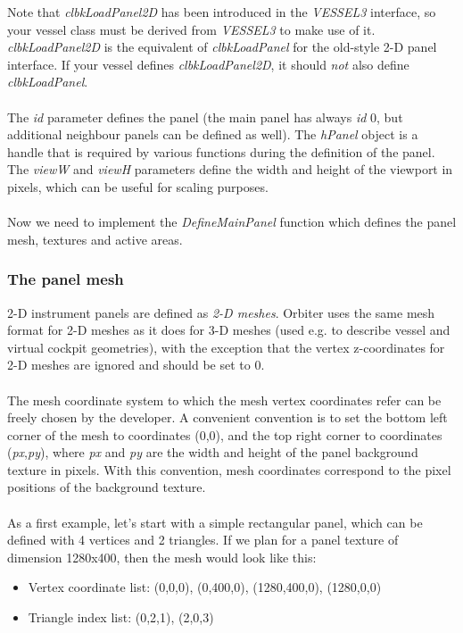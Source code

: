 \documentclass[Orbiter Developer Manual.tex]{subfiles}
\begin{document}
\noindent
Note that \textit{clbkLoadPanel2D} has been introduced in the \textit{VESSEL3} interface, so your vessel class must be derived from \textit{VESSEL3} to make use of it. \textit{clbkLoadPanel2D} is the equivalent of \textit{clbkLoadPanel} for the old-style 2-D panel interface. If your vessel defines \textit{clbkLoadPanel2D}, it should \textit{not} also define \textit{clbkLoadPanel}.\\
\\
The \textit{id} parameter defines the panel (the main panel has always \textit{id} 0, but additional neighbour panels can be defined as well). The \textit{hPanel} object is a handle that is required by various functions during the definition of the panel. The \textit{viewW} and \textit{viewH} parameters define the width and height of the viewport in pixels, which can be useful for scaling purposes.\\
\\
Now we need to implement the \textit{DefineMainPanel} function which defines the panel mesh, textures and active areas.


\subsubsection{The panel mesh}
2-D instrument panels are defined as \textit{2-D meshes}. Orbiter uses the same mesh format for 2-D meshes as it does for 3-D meshes (used e.g. to describe vessel and virtual cockpit geometries), with the exception that the vertex z-coordinates for 2-D meshes are ignored and should be set to 0.\\
\\
The mesh coordinate system to which the mesh vertex coordinates refer can be freely chosen by the developer. A convenient convention is to set the bottom left corner of the mesh to coordinates (0,0), and the top right corner to coordinates (\textit{px},\textit{py}), where \textit{px} and \textit{py} are the width and height of the panel background texture in pixels. With this convention, mesh coordinates correspond to the pixel positions of the background texture.\\
\\
As a first example, let’s start with a simple rectangular panel, which can be defined with 4 vertices and 2 triangles. If we plan for a panel texture of dimension 1280x400, then the mesh would look like this:
\begin{itemize}
\item Vertex coordinate list: (0,0,0), (0,400,0), (1280,400,0), (1280,0,0)
\item Triangle index list: (0,2,1), (2,0,3)
\end{itemize}
\end{document}
